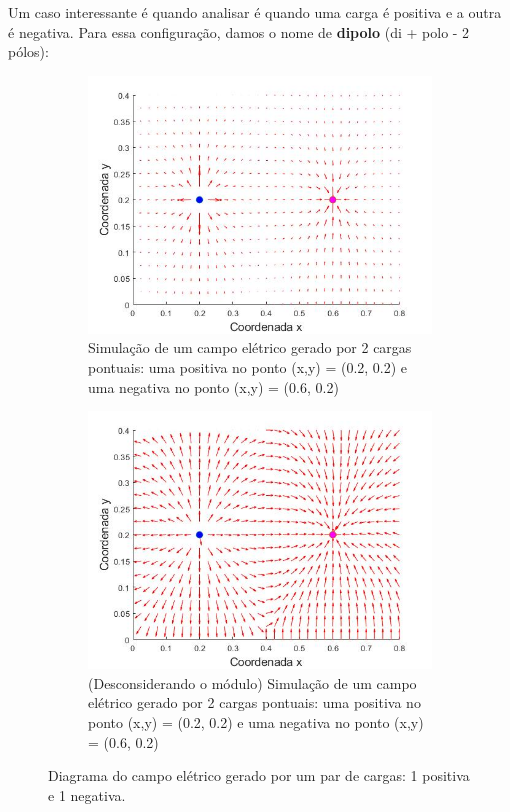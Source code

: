 \documentclass[12pt]{extarticle}
\newcommand{\<}{\langle}
\renewcommand{\>}{\rangle}
\theoremstyle{definition}
\begin{document}
Um caso interessante é quando analisar é quando uma carga é positiva e a outra é negativa. Para essa configuração, damos o nome de \textbf{dipolo} (di + polo - 2 pólos):
\begin{figure}[H]
     \centering
     \begin{subfigure}[b]{0.45\textwidth}
         \centering
         \includegraphics[width=\textwidth]{dipole.jpg}
         \caption{Simulação de um campo elétrico gerado por 2 cargas pontuais: uma positiva no ponto (x,y) = (0.2, 0.2) e uma negativa no ponto (x,y) = (0.6, 0.2)}
         \label{fig:dipole_field}
     \end{subfigure}
     \quad\quad
     \begin{subfigure}[b]{0.45\textwidth}
         \centering
         \includegraphics[width=\textwidth]{dipole_2.jpg}
         \caption{(Desconsiderando o módulo) Simulação de um campo elétrico gerado por 2 cargas pontuais: uma positiva no ponto (x,y) = (0.2, 0.2) e uma negativa no ponto (x,y) = (0.6, 0.2)}
         \label{fig:field_-}
     \end{subfigure}
        \caption{Diagrama do campo elétrico gerado por um par de cargas: 1 positiva e 1 negativa.}
        \label{fig:dipole_field_no_size}
\end{figure}
\end{document}
